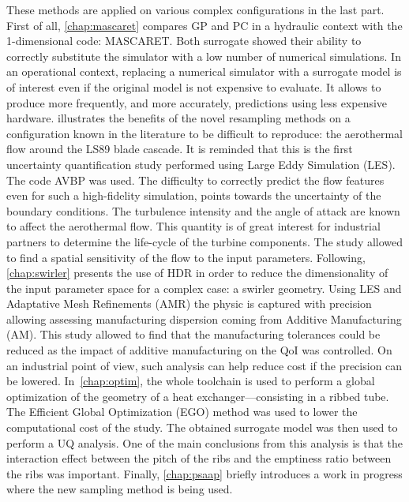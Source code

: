 These methods are applied on various complex configurations in the last part. First of all, \cref{chap:mascaret} compares GP and PC in a hydraulic context with the 1-dimensional code: MASCARET. Both surrogate showed their ability to correctly substitute the simulator with a low number of numerical simulations. In an operational context, replacing a numerical simulator with  a surrogate model is of interest even if the original model is not expensive to evaluate. It allows to produce more frequently, and more accurately, predictions using less expensive hardware.  illustrates the benefits of the novel resampling methods on a configuration known in the literature to be difficult to reproduce: the aerothermal flow around the LS89 blade cascade. It is reminded that this is the first uncertainty quantification study performed using Large Eddy Simulation (LES). The code AVBP was used. The difficulty to correctly predict the flow features even for such a high-fidelity simulation, points towards the uncertainty of the boundary conditions. The turbulence intensity and the angle of attack are known to affect the aerothermal flow. This quantity is of great interest for industrial partners to determine the life-cycle of the turbine components. The study allowed to find a spatial sensitivity of the flow to the input parameters. Following, \cref{chap:swirler} presents the use of HDR in order to reduce the dimensionality of the input parameter space for a complex case: a swirler geometry. Using LES and Adaptative Mesh Refinements (AMR) the physic is captured with precision allowing assessing manufacturing dispersion coming from Additive Manufacturing (AM). This study allowed to find that the manufacturing tolerances could be reduced as the impact of additive manufacturing on the QoI was controlled. On an industrial point of view, such analysis can help reduce cost if the precision can be lowered. In~\cref{chap:optim}, the whole toolchain is used to perform a global optimization of the geometry of a heat exchanger---consisting in a ribbed tube. The Efficient Global Optimization (EGO) method was used to lower the computational cost of the study. The obtained surrogate model was then used to perform a UQ analysis. One of the main conclusions from this analysis is that the interaction effect between the pitch of the ribs and the emptiness ratio between the ribs was important. Finally, \cref{chap:psaap} briefly introduces a work in progress where the new sampling method is being used.\\

